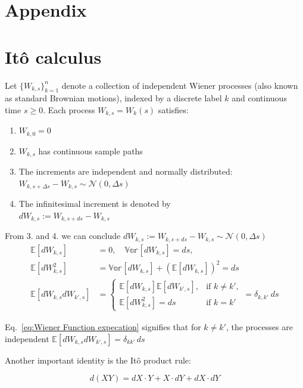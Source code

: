 \documentclass[9pt,a4paper,twocolumn,twoside]{tau-class/tau}
\begin{document}
\section*{\LARGE Appendix}

\section{Itô calculus}
\label{appendix:Itô calculus}

Let \( \{W_{k,s}\}_{k=1}^n \) denote a collection of independent Wiener processes (also known as standard Brownian motions), indexed by a discrete label \( k \) and continuous time \( s \geq 0 \).
Each process \( W_{k,s} = W_k(s)\) satisfies:

\begin{enumerate}
    \item \( W_{k,0} = 0 \)
    \item \( W_{k,s} \) has continuous sample paths
    \item The increments are independent and normally distributed: $W_{k,s+\Delta s} - W_{k,s} \sim \mathcal{N}(0, \Delta s)$
    \item The infinitesimal increment is denoted by \\\( dW_{k,s} := W_{k,s+ds} - W_{k,s} \)
\end{enumerate}

From 3. and 4. we can conclude \( dW_{k,s} := W_{k,s+ds} - W_{k,s} \sim \mathcal{N}(0, \Delta s) \)
\begin{align}
\mathbb{E}[dW_{k,s}] &= 0, \quad \mathbb{Var}[dW_{k,s}] = ds,\\
\mathbb{E}[dW_{k,s}^2] &= \mathbb{Var}[dW_{k,s}]+ (\mathbb{E}[dW_{k,s}])^2 = ds\\
\mathbb{E}[dW_{k,s} dW_{k',s}] &= \begin{cases} \mathbb{E}[dW_{k,s}]\mathbb{E}[dW_{k',s}],& \text{if } k\neq k', \\ \mathbb{E}[dW_{k,s}^2] = ds & \text{if } k = k' \end{cases} = \delta_{k,k'} \ ds
\label{eq:Wiener Function expecation}
\end{align}

Eq.~\eqref{eq:Wiener Function expecation} signifies that for \( k \ne k' \), the processes are independent \(\mathbb{E}[dW_{k,s} dW_{k',s}] = \delta_{k k'}\, ds\)

Another important identity is the Itô product rule: 

\begin{equation}
    d(XY) = dX \cdot Y + X \cdot dY + dX \cdot dY
    \label{eq: Itô product rule}
\end{equation}
\end{document}
